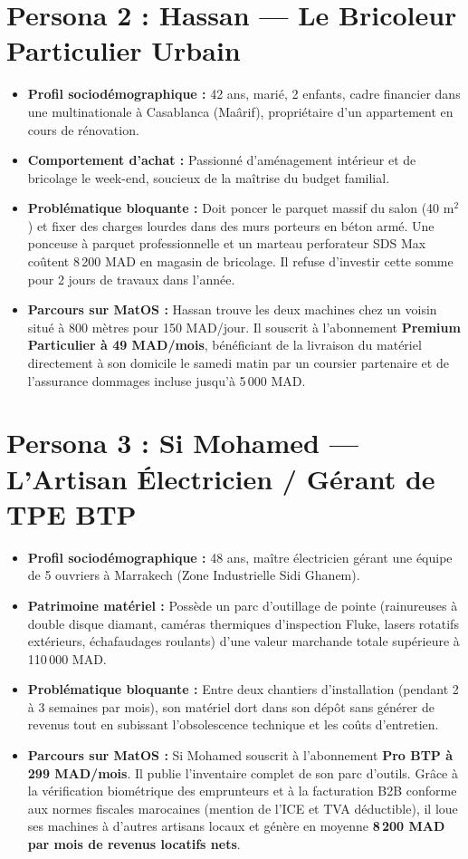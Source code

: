 \documentclass[11pt,a4paper]{report}
\begin{document}
\section{Persona 2 : Hassan --- Le Bricoleur Particulier Urbain}
\begin{itemize}[leftmargin=*]
    \item \textbf{Profil sociodémographique :} 42 ans, marié, 2 enfants, cadre financier dans une multinationale à Casablanca (Maârif), propriétaire d'un appartement en cours de rénovation.
    \item \textbf{Comportement d'achat :} Passionné d'aménagement intérieur et de bricolage le week-end, soucieux de la maîtrise du budget familial.
    \item \textbf{Problématique bloquante :} Doit poncer le parquet massif du salon (40 m$^2$) et fixer des charges lourdes dans des murs porteurs en béton armé. Une ponceuse à parquet professionnelle et un marteau perforateur SDS Max coûtent 8\,200 MAD en magasin de bricolage. Il refuse d'investir cette somme pour 2 jours de travaux dans l'année.
    \item \textbf{Parcours sur MatOS :} Hassan trouve les deux machines chez un voisin situé à 800 mètres pour 150 MAD/jour. Il souscrit à l'abonnement \textbf{Premium Particulier à 49 MAD/mois}, bénéficiant de la livraison du matériel directement à son domicile le samedi matin par un coursier partenaire et de l'assurance dommages incluse jusqu'à 5\,000 MAD.
\end{itemize}

\section{Persona 3 : Si Mohamed --- L'Artisan Électricien / Gérant de TPE BTP}
\begin{itemize}[leftmargin=*]
    \item \textbf{Profil sociodémographique :} 48 ans, maître électricien gérant une équipe de 5 ouvriers à Marrakech (Zone Industrielle Sidi Ghanem).
    \item \textbf{Patrimoine matériel :} Possède un parc d'outillage de pointe (rainureuses à double disque diamant, caméras thermiques d'inspection Fluke, lasers rotatifs extérieurs, échafaudages roulants) d'une valeur marchande totale supérieure à 110\,000 MAD.
    \item \textbf{Problématique bloquante :} Entre deux chantiers d'installation (pendant 2 à 3 semaines par mois), son matériel dort dans son dépôt sans générer de revenus tout en subissant l'obsolescence technique et les coûts d'entretien.
    \item \textbf{Parcours sur MatOS :} Si Mohamed souscrit à l'abonnement \textbf{Pro BTP à 299 MAD/mois}. Il publie l'inventaire complet de son parc d'outils. Grâce à la vérification biométrique des emprunteurs et à la facturation B2B conforme aux normes fiscales marocaines (mention de l'ICE et TVA déductible), il loue ses machines à d'autres artisans locaux et génère en moyenne \textbf{8\,200 MAD par mois de revenus locatifs nets}.
\end{itemize}
\end{document}
